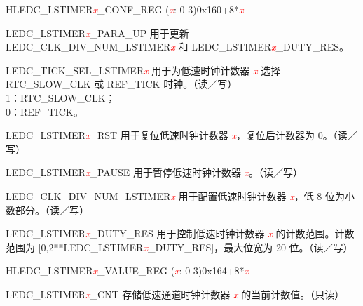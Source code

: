 \begin{register}{H}{LEDC\_LSTIMER\textit{\textcolor{red}{\it{x}}}\_CONF\_REG (\textit{\textcolor{red}{\it{x}}}: 0-3)}{0x160+8*\textit{\textcolor{red}{\it{x}}}}\label{regdesc:LEDCLSTIMERnCONFREG}
%
%
%
%
%
%
%
\regnewline%
\begin{regdesc}\begin{reglist}
\item [LEDC\_LSTIMER\textcolor{red}{\it{x}}\_PARA\_UP] 用于更新  LEDC\_CLK\_DIV\_NUM\_LSTIMER\textcolor{red}{\it{x}} 和  LEDC\_LSTIMER\textcolor{red}{\it{x}}\_DUTY\_RES。
\item [LEDC\_TICK\_SEL\_LSTIMER\textcolor{red}{\it{x}}] 用于为低速时钟计数器 \textcolor{red}{\it{x}} 选择 RTC\_SLOW\_CLK 或 REF\_TICK 时钟。（读／写）\\
1：RTC\_SLOW\_CLK；\\
0：REF\_TICK。
\item [LEDC\_LSTIMER\textcolor{red}{\it{x}}\_RST] 用于复位低速时钟计数器 \textcolor{red}{\it{x}}，复位后计数器为 0。（读／写）
\item [LEDC\_LSTIMER\textcolor{red}{\it{x}}\_PAUSE] 用于暂停低速时钟计数器 \textcolor{red}{\it{x}}。（读／写）
\item [LEDC\_CLK\_DIV\_NUM\_LSTIMER\textcolor{red}{\it{x}}] 用于配置低速时钟计数器 \textcolor{red}{\it{x}}，低 8 位为小数部分。（读／写）
\item [LEDC\_LSTIMER\textcolor{red}{\it{x}}\_DUTY\_RES] 用于控制低速时钟计数器 \textcolor{red}{\it{x}} 的计数范围。计数范围为 [0,2**LEDC\_LSTIMER\textcolor{red}{\it{x}}\_DUTY\_RES]，最大位宽为 20 位。（读／写）
\end{reglist}\end{regdesc}
\end{register}


\begin{register}{H}{LEDC\_LSTIMER\textit{\textcolor{red}{\it{x}}}\_VALUE\_REG (\textit{\textcolor{red}{\it{x}}}: 0-3)}{0x164+8*\textit{\textcolor{red}{\it{x}}}}\label{regdesc:LEDCLSTIMERnVALUEREG}
%
%
\regnewline%
\begin{regdesc}\begin{reglist}
\item [LEDC\_LSTIMER\textcolor{red}{\it{x}}\_CNT] 存储低速通道时钟计数器 \textcolor{red}{\it{x}} 的当前计数值。（只读）
\end{reglist}\end{regdesc}
\end{register}


